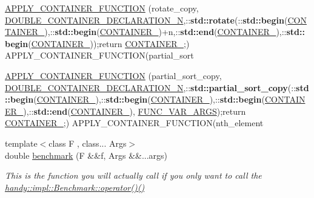 \begin{DoxyCompactItemize}
\item 
\hyperlink{namespacehandy_a33b83bf7d83a06837c61a8baf24ccce5}{A\+P\+P\+L\+Y\+\_\+\+C\+O\+N\+T\+A\+I\+N\+E\+R\+\_\+\+F\+U\+N\+C\+T\+I\+ON} (rotate\+\_\+copy, \hyperlink{Algorithms_8h_a1710716f622efa68abc209e9c6d213e8}{D\+O\+U\+B\+L\+E\+\_\+\+C\+O\+N\+T\+A\+I\+N\+E\+R\+\_\+\+D\+E\+C\+L\+A\+R\+A\+T\+I\+O\+N\+\_\+N},\+::{\bf std\+::rotate}(\+::{\bf std\+::begin}(\hyperlink{namespacehandy_a233c0491c05c437359a4404cd9b94fcc}{C\+O\+N\+T\+A\+I\+N\+E\+R\+\_}),\+::{\bf std\+::begin}(\hyperlink{namespacehandy_a233c0491c05c437359a4404cd9b94fcc}{C\+O\+N\+T\+A\+I\+N\+E\+R\+\_})+n,\+::{\bf std\+::end}(\hyperlink{namespacehandy_a233c0491c05c437359a4404cd9b94fcc}{C\+O\+N\+T\+A\+I\+N\+E\+R\+\_}),\+::{\bf std\+::begin}(\hyperlink{Algorithms_8h_acfc307df20cf90e1c270a9c1614d5e9e}{C\+O\+N\+T\+A\+I\+N\+E\+R\+\_}));return \hyperlink{Algorithms_8h_acfc307df20cf90e1c270a9c1614d5e9e}{C\+O\+N\+T\+A\+I\+N\+E\+R\+\_};) A\+P\+P\+L\+Y\+\_\+\+C\+O\+N\+T\+A\+I\+N\+E\+R\+\_\+\+F\+U\+N\+C\+T\+I\+ON(partial\+\_\+sort
\item 
\hyperlink{namespacehandy_affff91e8cf4e43cd3809846366a5af36}{A\+P\+P\+L\+Y\+\_\+\+C\+O\+N\+T\+A\+I\+N\+E\+R\+\_\+\+F\+U\+N\+C\+T\+I\+ON} (partial\+\_\+sort\+\_\+copy, \hyperlink{Algorithms_8h_a1710716f622efa68abc209e9c6d213e8}{D\+O\+U\+B\+L\+E\+\_\+\+C\+O\+N\+T\+A\+I\+N\+E\+R\+\_\+\+D\+E\+C\+L\+A\+R\+A\+T\+I\+O\+N\+\_\+N},\+::{\bf std\+::partial\+\_\+sort\+\_\+copy}(\+::{\bf std\+::begin}(\hyperlink{namespacehandy_a233c0491c05c437359a4404cd9b94fcc}{C\+O\+N\+T\+A\+I\+N\+E\+R\+\_}),\+::{\bf std\+::begin}(\hyperlink{namespacehandy_a233c0491c05c437359a4404cd9b94fcc}{C\+O\+N\+T\+A\+I\+N\+E\+R\+\_}),\+::{\bf std\+::begin}(\hyperlink{Algorithms_8h_acfc307df20cf90e1c270a9c1614d5e9e}{C\+O\+N\+T\+A\+I\+N\+E\+R\+\_}),\+::{\bf std\+::end}(\hyperlink{Algorithms_8h_acfc307df20cf90e1c270a9c1614d5e9e}{C\+O\+N\+T\+A\+I\+N\+E\+R\+\_}), \hyperlink{Algorithms_8h_ab87d0dee85e25fa6699760357a3a6aed}{F\+U\+N\+C\+\_\+\+V\+A\+R\+\_\+\+A\+R\+GS});return \hyperlink{namespacehandy_a233c0491c05c437359a4404cd9b94fcc}{C\+O\+N\+T\+A\+I\+N\+E\+R\+\_};) A\+P\+P\+L\+Y\+\_\+\+C\+O\+N\+T\+A\+I\+N\+E\+R\+\_\+\+F\+U\+N\+C\+T\+I\+ON(nth\+\_\+element
\item 
{\footnotesize template$<$class F , class... Args$>$ }\\double \hyperlink{namespacehandy_afe013a9ae07e9f0edaf27bf68666fae5}{benchmark} (F \&\&f, Args \&\&...args)
\begin{DoxyCompactList}\small\item\em This is the function you will actually call if you only want to call the \hyperlink{group__BenchmarkGroup_ga5eee042d87e75a24021ad6851a2c10ec}{handy\+::impl\+::\+Benchmark\+::operator()()} \end{DoxyCompactList}\item 

\end{DoxyCompactItemize}

